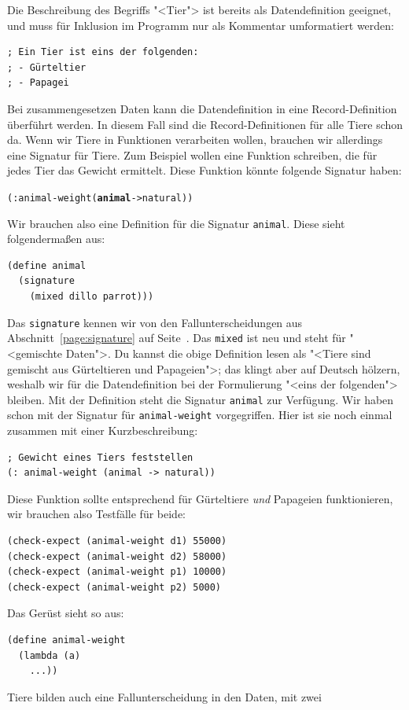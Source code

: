 Die Beschreibung des Begriffs "<Tier"> ist bereits als Datendefinition
geeignet, und muss für Inklusion im Programm nur als Kommentar
umformatiert werden:
%
\begin{verbatim}
; Ein Tier ist eins der folgenden:
; - Gürteltier
; - Papagei
\end{verbatim}
%
Bei zusammengesetzen Daten kann die Datendefinition in eine
Record-Definition überführt werden.  In diesem Fall sind die
Record-Definitionen für alle Tiere schon da.  Wenn wir Tiere in
Funktionen verarbeiten wollen, brauchen wir allerdings eine Signatur
für Tiere.  Zum Beispiel wollen eine Funktion schreiben, die für jedes
Tier das Gewicht ermittelt.  Diese Funktion könnte folgende Signatur haben:
%
\begin{alltt}
(: animal-weight (\textbf{animal} -> natural))
\end{alltt}
%
Wir brauchen also eine Definition für die Signatur \texttt{animal}.
Diese sieht folgendermaßen aus:
%
\begin{verbatim}
(define animal
  (signature
    (mixed dillo parrot)))
\end{verbatim}
%
Das \texttt{signature} kennen wir von den Fallunterscheidungen aus
Abschnitt~\ref{page:signature} auf Seite~\pageref{page:signature}.
Das \texttt{mixed} ist neu und steht
für "<gemischte Daten">.  Du kannst die obige Definition lesen als
"<Tiere sind gemischt aus Gürteltieren und Papageien">; das klingt
aber auf Deutsch hölzern, weshalb wir für die Datendefinition bei der
Formulierung "<eins der folgenden"> bleiben.  Mit der Definition steht
die Signatur \texttt{animal} zur Verfügung.  Wir haben schon mit der
Signatur für \texttt{animal-weight} vorgegriffen.  Hier ist sie noch
einmal zusammen mit einer Kurzbeschreibung:
%
\begin{verbatim}
; Gewicht eines Tiers feststellen
(: animal-weight (animal -> natural))
\end{verbatim}
%
Diese Funktion sollte entsprechend für Gürteltiere \emph{und}
Papageien funktionieren, wir brauchen also Testfälle für beide:
%
\begin{verbatim}
(check-expect (animal-weight d1) 55000)
(check-expect (animal-weight d2) 58000)
(check-expect (animal-weight p1) 10000)
(check-expect (animal-weight p2) 5000)
\end{verbatim}
%
Das Gerüst sieht so aus:
%
\begin{verbatim}
(define animal-weight
  (lambda (a)
    ...))
\end{verbatim}
%
Tiere bilden auch eine Fallunterscheidung in den Daten, mit zwei
